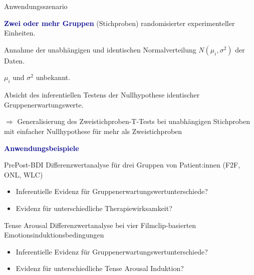 \documentclass[
  8pt,
  ignorenonframetext,
]{beamer}
\providecommand{\tightlist}{%
  \setlength{\itemsep}{0pt}\setlength{\parskip}{0pt}}
\begin{document}
\begin{frame}{Anwendungsszenario}
\protect\hypertarget{anwendungsszenario}{}
\small

\textbf{\textcolor{darkblue}{Zwei oder mehr Gruppen}} (Stichproben)
randomisierter experimenteller Einheiten.

Annahme der unabhängigen und identischen Normalverteilung
\(N(\mu_i,\sigma^2)\) der Daten.

\(\mu_i\) und \(\sigma^2\) unbekannt.

Absicht des inferentiellen Testens der Nullhypothese identischer
Gruppenerwartungswerte.

\begin{center}
$\Rightarrow$ Generalisierung des Zweistichproben-T-Tests bei unabhängigen Stichproben mit
einfacher Nullhypothese für mehr als Zweistichproben
\end{center}

\vspace{2mm}

\textbf{\textcolor{darkblue}{Anwendungsbeispiele}}

PrePost-BDI Differenzwertanalyse für drei Gruppen von Patient:innen
(F2F, ONL, WLC)

\begin{itemize}
\tightlist
\item
  Inferentielle Evidenz für Gruppenerwartungswertunterschiede?
\item
  Evidenz für unterschiedliche Therapiewirksamkeit?
\end{itemize}

Tense Arousal Differenzwertanalyse bei vier Filmclip-basierten
Emotionsinduktionsbedingungen

\begin{itemize}
\tightlist
\item
  Inferentielle Evidenz für Gruppenerwartungswertunterschiede?
\item
  Evidenz für unterschiedliche Tense Arousal Induktion?
\end{itemize}
\end{frame}
\end{document}
